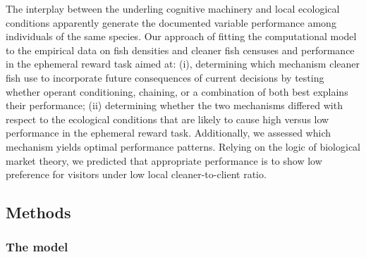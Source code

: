\documentclass[]{rsos}%
\begin{document}
The interplay between the underling cognitive machinery and
local ecological conditions apparently generate the documented variable
performance among individuals of the same species.
Our approach of fitting the computational model to the empirical data on
fish densities and cleaner fish censuses and performance
in the ephemeral reward task aimed at: (i), determining which
mechanism cleaner fish use to incorporate future consequences of current
decisions by testing whether operant conditioning, chaining, or a combination
of both best explains their performance; (ii) determining whether the
two mechanisms differed with respect to the ecological conditions
that are likely to cause high versus low performance in the
ephemeral reward task. Additionally, we assessed which mechanism
yields optimal performance patterns. Relying on the logic of
biological market theory, we predicted
that appropriate performance is to show low preference for visitors under low
local cleaner-to-client ratio.

\hypertarget{methods}{%
\subsection{Methods}\label{methods}}

\hypertarget{the-model}{%
\subsubsection{The model}\label{the-model}}
\end{document}
